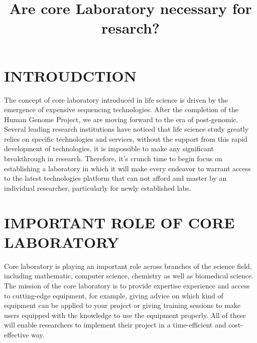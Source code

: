 \documentclass[12pt]{article}
\begin{document}
  
\title{\large Are core Laboratory necessary for resarch? \vspace{-2em}}
\date{\vspace{-2.5em}}
\maketitle

\section{INTROUDCTION}
The concept of core laboratory introduced in life science is driven by the emergence of expensive sequencing technologies. After the completion of the Human Genome Project, we are moving forward to the era of post-genomic. Several leading research institutions have noticed that life science study greatly relies on specific technologies and services, without the support from this rapid development of technologies, it is impossible to make any significant breakthrough in research. Therefore, it's crunch time to begin focus on establishing a laboratory in which it will make every endeavor to warrant access to the latest technologies platform that can not afford and master by an individual researcher, particularly for newly established labs.
\medskip

\section{IMPORTANT ROLE OF CORE LABORATORY}
Core laboratory is playing an important role across branches of the science field, including mathematic, computer science, chemistry as well as biomedical science. The mission of the core laboratory is to provide expertise experience and access to cutting-edge equipment, for example, giving advice on which kind of equipment can be applied to your project or giving training sessions to make users equipped with the knowledge to use the equipment properly. All of these will enable researchers to implement their project in a time-efficient and cost-effective way.\medskip
\end{document}
